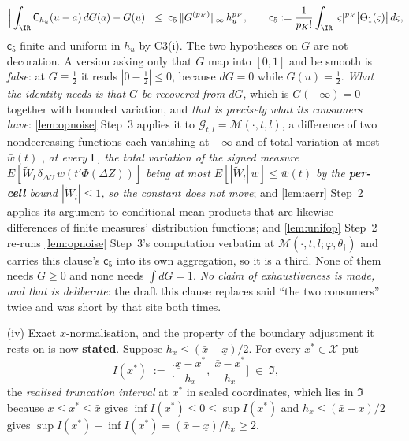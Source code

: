 \begin{lemma}
\begin{enumerate}
\[
\Big|\int_{\IR}\mathsf C_{h_u}(u-a)\,dG(a)-G(u)\Big|
\;\le\;\mathsf c_5\,\|G^{(p_K)}\|_\infty\,h_u^{p_K},
\qquad
\mathsf c_5:=\frac1{p_K!}\int_{\IR}|\varsigma|^{p_K}\big|\Theta_1(\varsigma)\big|\,d\varsigma ,
\]
$\mathsf c_5$ finite and uniform in $h_u$ by C3(i). The two hypotheses on $G$ are not decoration.
A version asking only that $G$ map into $[0,1]$ and be smooth is \emph{false}: at $G\equiv\tfrac12$ it
reads $|0-\tfrac12|\le0$, because $dG=0$ while $G(u)=\tfrac12$. \emph{What the identity needs is that
$G$ be recovered from $dG$}, which is
$G(-\infty)=0$ together with bounded variation, and \emph{that is precisely what its consumers have}:
\cref{lem:opnoise} Step~3 applies it to $\mathcal G_{t,l}=\mathcal M(\cdot,t,l)$, a difference of two
nondecreasing functions each vanishing at $-\infty$ and of total variation at most $\bar w(t)$
, \emph{at every $\mathsf L$, the total variation of the signed measure
$E[\widetilde W_l\,\delta_{\Delta U}\,w(t'\Phi(\Delta Z))]$ being at most
$E[|\widetilde W_l|\,w]\le\bar w(t)$ by the \textbf{per-cell} bound $|\widetilde W_l|\le1$, so the
constant does not move}; and
\cref{lem:aerr} Step~2 applies its argument to conditional-mean products that are likewise differences
of finite measures' distribution functions; and \cref{lem:unifop} Step~2 re-runs
\cref{lem:opnoise} Step~3's computation verbatim at
$\mathcal M(\cdot,t,l;\varphi,\theta_\dagger)$ and carries this clause's $\mathsf c_5$ into its own
aggregation, so it is a third. None of them needs $G\ge0$ and none needs $\int dG=1$. \emph{No claim
of exhaustiveness is made, and that is deliberate}: the draft this clause replaces said ``the two
consumers'' twice and was short by that site both times.
\item[(iv)] Exact $x$-normalisation, and the property of the boundary adjustment it rests on is
now \textbf{stated}. Suppose $h_x\le(\bar x-\underline x)/2$. For every $x^\ast\in\mathcal X$ put
\begin{equation}\label{eq:ivalx}
I(x^\ast)\;:=\;\Big[\frac{\underline x-x^\ast}{h_x},\ \frac{\bar x-x^\ast}{h_x}\Big]\;\in\;\mathfrak I ,
\end{equation}
the \emph{realised truncation interval} at $x^\ast$ in scaled coordinates, which lies in $\mathfrak I$
because $\underline x\le x^\ast\le\bar x$ gives $\inf I(x^\ast)\le0\le\sup I(x^\ast)$ and
$h_x\le(\bar x-\underline x)/2$ gives $\sup I(x^\ast)-\inf I(x^\ast)=(\bar x-\underline x)/h_x\ge2$.

\end{enumerate}
\end{lemma}
